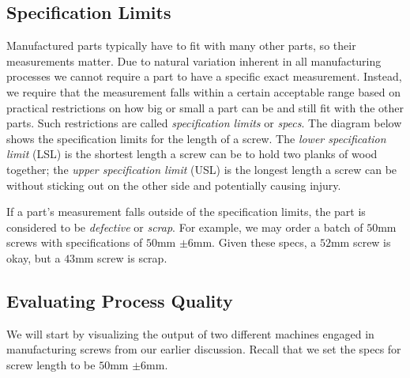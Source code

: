 \documentclass{ximera}
\begin{document}
\subsection*{Specification Limits}
Manufactured parts typically have to fit with many other parts, so their measurements matter. Due to natural variation inherent in all manufacturing processes we cannot require a part to have a specific exact measurement.  Instead, we require that the measurement falls within a certain acceptable range based on practical restrictions on how big or small a part can be and still fit with the other parts.  Such restrictions are called \emph{specification limits} or \emph{specs}.  The diagram below shows the specification limits for the length of a screw.  The \emph{lower specification limit} (LSL) is the shortest length a screw can be to hold two planks of wood together; the \emph{upper specification limit} (USL) is the longest length a screw can be without sticking out on the other side and potentially causing injury.

\begin{center}
      \end{center}

If a part's measurement falls outside of the specification limits, the part is considered to be \emph{defective} or \emph{scrap}.  For example, we may order a batch of $50$mm screws with specifications of $50$mm $\pm 6$mm.   Given these specs, a $52$mm screw is okay, but a $43$mm screw is scrap.

\subsection*{Evaluating Process Quality}
We will start by visualizing the output of two different machines engaged in manufacturing screws from our earlier discussion.  Recall that we set the specs for screw length to be $50$mm $\pm 6$mm.  
\end{document}
